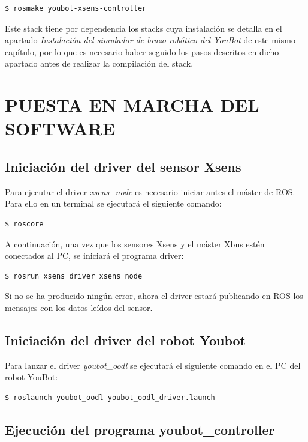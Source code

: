 \documentclass[12pt, a4paper]{report}
\begin{document}
\begin{verbatim}
$ rosmake youbot-xsens-controller
\end{verbatim}

Este stack tiene por dependencia los stacks cuya instalación se detalla en el apartado \textit{Instalación del simulador de brazo robótico del YouBot} de este mismo capítulo, por lo que es necesario haber seguido los pasos descritos en dicho apartado antes de realizar la compilación del stack. 

\chapter{PUESTA EN MARCHA DEL SOFTWARE}

\section{Iniciación del driver del sensor Xsens}

Para ejecutar el driver \textit{xsens\_node} es necesario iniciar antes el máster de ROS. Para ello en un terminal se ejecutará el siguiente comando:

\begin{verbatim}
$ roscore
\end{verbatim}

A continuación, una vez que los sensores Xsens y el máster Xbus estén conectados al PC, se iniciará el programa driver:

\begin{verbatim}
$ rosrun xsens_driver xsens_node
\end{verbatim}

Si no se ha producido ningún error, ahora el driver estará publicando en ROS los mensajes con los datos leídos del sensor.

\section{Iniciación del driver del robot Youbot}

Para lanzar el driver \textit{youbot\_oodl} se ejecutará el siguiente comando en el PC del robot YouBot:

\begin{verbatim}
$ roslaunch youbot_oodl youbot_oodl_driver.launch
\end{verbatim}

\section{Ejecución del programa youbot\_controller}
\end{document}
